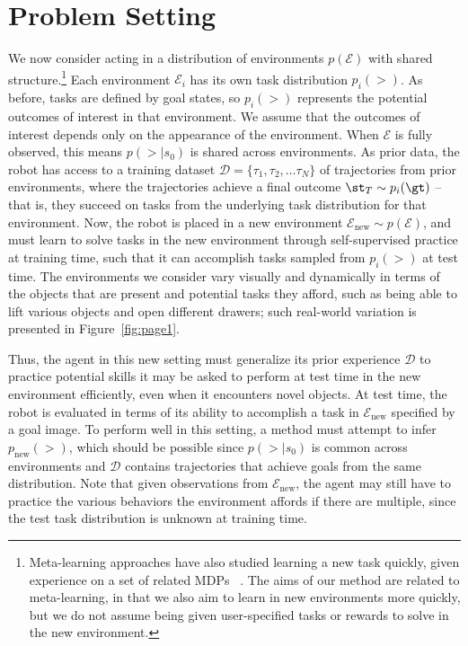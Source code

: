 \section{Problem Setting}

We now consider acting in a distribution of environments $p(\mathcal{E})$ with shared structure.\footnote{Meta-learning approaches have also studied learning a new task quickly, given experience on a set of related MDPs ~\citep{duan2016rl2, finn2017maml, rakelly2019pearl}. The aims of our method are related to meta-learning, in that we also aim to learn in new environments more quickly, but we do not assume being given user-specified tasks or rewards to solve in the new environment.}
Each environment $\mathcal{E}_i$ has its own task distribution $p_i(\gt)$. 
As before, tasks are defined by goal states, so $p_i(\gt)$ represents the potential outcomes of interest in that environment.
We assume that the outcomes of interest depends only on the appearance of the environment.
When $\mathcal{E}$ is fully observed, this means $p(\gt|s_0)$ is shared across environments.
As prior data, the robot has access to a training dataset $\mathcal{D} = \{\tau_1, \tau_2, \dots \tau_N\}$ of trajectories from prior environments, where the trajectories achieve a final outcome $\st_T \sim p_i(\gt)$ -- that is, they succeed on tasks from the underlying task distribution for that environment. 
Now, the robot is placed in a new environment $\mathcal{E}_\text{new} \sim p(\mathcal{E})$, and must learn to solve tasks in the new environment through self-supervised practice at training time, such that it can accomplish tasks sampled from $p_i(\gt)$ at test time.
The environments we consider vary visually and dynamically in terms of the objects that are present and potential tasks they afford, such as being able to lift various objects and open different drawers; such real-world variation is presented in Figure~\ref{fig:page1}.

Thus, the agent in this new setting must generalize its prior experience $\mathcal{D}$ to practice potential skills it may be asked to perform at test time in the new environment efficiently, even when it encounters novel objects.
At test time, the robot is evaluated in terms of its ability to accomplish a task in $\mathcal{E}_\text{new}$ specified by a goal image.
To perform well in this setting, a method must attempt to infer $p_\text{new}(\gt)$, which should be possible since $p(\gt|s_0)$ is common across environments and $\mathcal{D}$ contains trajectories that achieve goals from the same distribution.
Note that given observations from $\mathcal{E}_\text{new}$, the agent may still have to practice the various behaviors the environment affords if there are multiple, since the test task distribution is unknown at training time.

